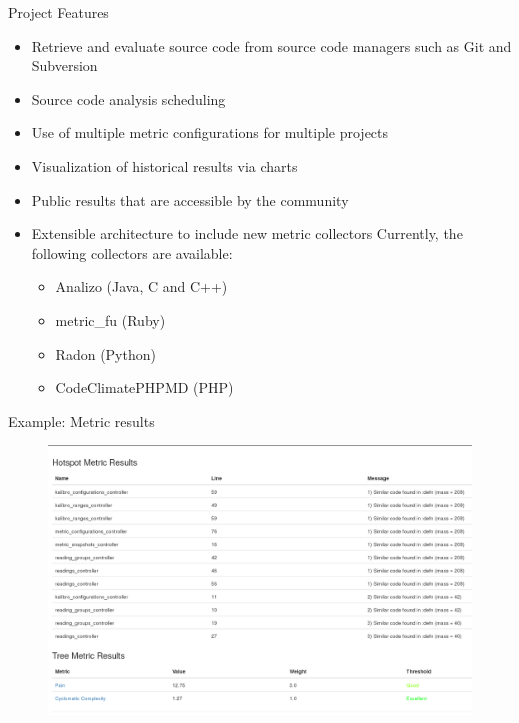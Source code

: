 \begin{block}{Project Features}
    \begin{itemize}
        \item Retrieve and evaluate source code from source code managers
            such as Git and Subversion
        \item Source code analysis scheduling
        \item Use of multiple metric configurations for multiple
            projects
        \item Visualization of historical results via charts
        \item Public results that are accessible by the community
        \item Extensible architecture to include new metric collectors
            Currently, the following collectors are available:
            \begin{itemize}
							\item Analizo (Java, C and C++)
							\item metric\_fu (Ruby)
							\item Radon (Python)
							\item CodeClimatePHPMD (PHP)
            \end{itemize}
    \end{itemize}
\end{block}

\begin{block}{Example: Metric results}
    \begin{figure}
        \begin{center}
            \includegraphics[width=\textwidth]{figures/MetricResults.png}
                \label{fig:feature1}
        \end{center}
    \end{figure}
\end{block}

